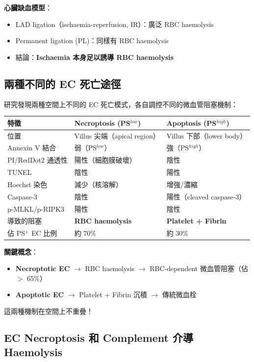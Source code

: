 \documentclass[12pt,a4paper]{article}
\begin{document}
\textbf{心臟缺血模型}：
\begin{itemize}
    \item LAD ligation（ischaemia-reperfusion, IR）：廣泛 RBC haemolysis
    \item Permanent ligation (PL)：同樣有 RBC haemolysis
    \item 結論：\textbf{Ischaemia 本身足以誘導 RBC haemolysis}
\end{itemize}

\subsection{兩種不同的 EC 死亡途徑}

研究發現兩種空間上不同的 EC 死亡模式，各自調控不同的微血管阻塞機制：

\begin{longtable}{p{3.5cm}p{5.5cm}p{5cm}}
\toprule
\textbf{特徵} & \textbf{Necroptosis (PS$^{low}$)} & \textbf{Apoptosis (PS$^{high}$)} \\
\midrule
\endhead
位置 & Villus 尖端（apical region） & Villus 下部（lower body） \\
Annexin V 結合 & 弱（PS$^{low}$） & 強（PS$^{high}$） \\
PI/RedDot2 通透性 & 陽性（細胞膜破壞） & 陰性 \\
TUNEL & 陰性 & 陽性 \\
Hoechst 染色 & 減少（核溶解） & 增強/濃縮 \\
Caspase-3 & 陰性 & 陽性（cleaved caspase-3） \\
p-MLKL/p-RIPK3 & 陽性 & 陰性 \\
導致的阻塞 & \textbf{RBC haemolysis} & \textbf{Platelet + Fibrin} \\
佔 PS$^+$ EC 比例 & 約 70\% & 約 30\% \\
\bottomrule
\end{longtable}

\begin{importantbox}
\textbf{關鍵概念}：
\begin{itemize}
    \item \textbf{Necroptotic EC} $\rightarrow$ RBC haemolysis $\rightarrow$ RBC-dependent 微血管阻塞（佔 $>$ 65\%）
    \item \textbf{Apoptotic EC} $\rightarrow$ Platelet + Fibrin 沉積 $\rightarrow$ 傳統微血栓
\end{itemize}
這兩種機制在空間上不重疊！
\end{importantbox}

\subsection{EC Necroptosis 和 Complement 介導 Haemolysis}
\end{document}
